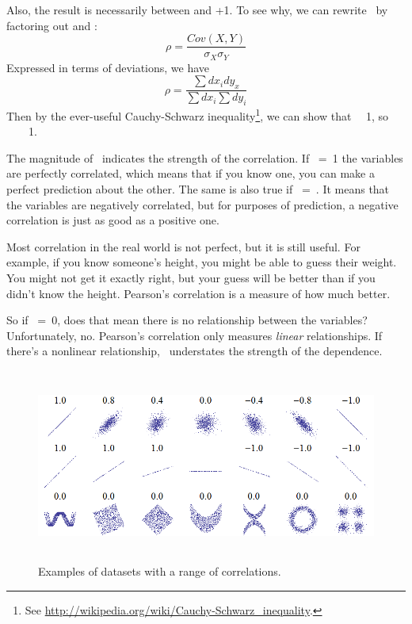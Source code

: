 \documentclass[12pt]{book}
\begin{document}
Also, the result is necessarily between  and +1.  To see why, we
can rewrite \myrho~by factoring out \mysigma {} and \mysigma {}:
%
\[ \rho = \frac{Cov(X,Y)}{\sigma_X \sigma_Y} \]
%
Expressed in terms of deviations, we have
%
\[ \rho = \frac{\sum dx_i dy_x}{\sum dx_i \sum dy_i} \]
%
Then by the ever-useful Cauchy-Schwarz inequality\footnote{See
  \url{http://wikipedia.org/wiki/Cauchy-Schwarz_inequality}.}, we can show
that \myrho{}~\myle~1, so ~\myle~\myrho~\myle~1.

The magnitude of \myrho~indicates the strength of the correlation.  If
\myrho~=~1 the variables are perfectly correlated, which means that if
you know one, you can make a perfect prediction about the other.  The
same is also true if \myrho~=~.  It means that the variables
are negatively correlated, but for purposes of prediction, a
negative correlation is just as good as a positive one.

Most correlation in the real world is not perfect, but it
is still useful.  For example, if you know someone's height, you might
be able to guess their weight.  You might not get it exactly right, but
your guess will be better than if you didn't know the height.
Pearson's correlation is a measure of how much better.

So if \myrho~=~0, does that mean there is no
relationship between the variables?  Unfortunately, no.  Pearson's
correlation only measures {\em linear} relationships.  If there's a
nonlinear relationship, \myrho~understates the strength of the
dependence.

\begin{figure}
\centerline{\includegraphics[height=2.5in]{figs/Correlation_examples.png}}
\caption{Examples of datasets with a range of correlations.}
\label{corr_examples}
\end{figure}
\end{document}
